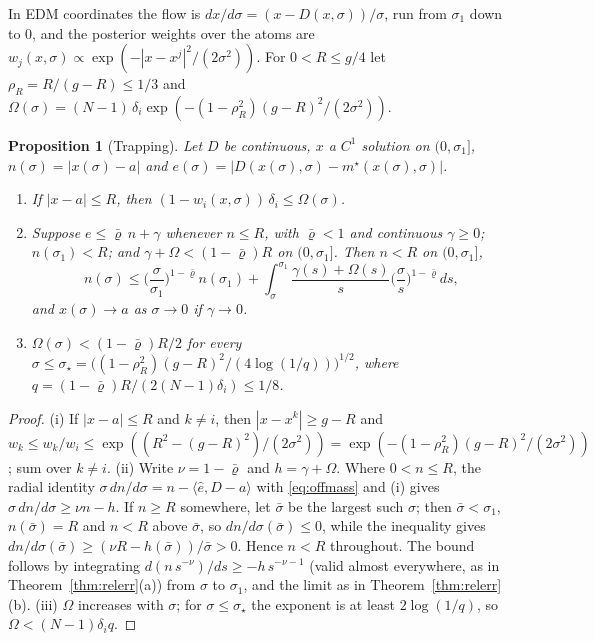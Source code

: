\documentclass{article} %
\theoremstyle{plain}
\newtheorem{proposition}[theorem]{Proposition}
\theoremstyle{definition}
\theoremstyle{remark}
\begin{document}
In EDM coordinates the flow is $dx/d\sigma=(x-D(x,\sigma))/\sigma$, run from $\sigma_1$ down to $0$, and
the posterior weights over the atoms are
$w_j(x,\sigma)\propto\exp(-|x-x^j|^2/(2\sigma^2))$. For $0<R\le g/4$ let $\rho_R=R/(g-R)\le1/3$ and
$\Omega(\sigma)=(N-1)\,\delta_i\exp(-(1-\rho_R^2)(g-R)^2/(2\sigma^2))$.

\begin{proposition}[Trapping]
\label{prop:trap}
Let $D$ be continuous, $x$ a $C^1$ solution on $(0,\sigma_1]$, $n(\sigma)=|x(\sigma)-a|$ and
$e(\sigma)=|D(x(\sigma),\sigma)-m^\star(x(\sigma),\sigma)|$.
\begin{enumerate}[label=(\roman*),leftmargin=2em]
\item If $|x-a|\le R$, then $(1-w_i(x,\sigma))\,\delta_i\le\Omega(\sigma)$.
\item Suppose $e\le\bar\varrho\,n+\gamma$ whenever $n\le R$, with $\bar\varrho<1$ and continuous
  $\gamma\ge0$; $n(\sigma_1)<R$; and $\gamma+\Omega<(1-\bar\varrho)R$ on $(0,\sigma_1]$. Then
  $n<R$ on $(0,\sigma_1]$,
  \[
  n(\sigma)\le\Big(\frac{\sigma}{\sigma_1}\Big)^{1-\bar\varrho}n(\sigma_1)
  +\int_\sigma^{\sigma_1}\frac{\gamma(s)+\Omega(s)}{s}\Big(\frac{\sigma}{s}\Big)^{1-\bar\varrho}ds,
  \]
  and $x(\sigma)\to a$ as $\sigma\to0$ if $\gamma\to0$.
\item $\Omega(\sigma)<(1-\bar\varrho)R/2$ for every
  $\sigma\le\sigma_\star=\big((1-\rho_R^2)(g-R)^2/(4\log(1/q))\big)^{1/2}$, where
  $q=(1-\bar\varrho)R/(2(N-1)\delta_i)\le1/8$.
\end{enumerate}
\end{proposition}

\begin{proof}
(i) If $|x-a|\le R$ and $k\ne i$, then $|x-x^k|\ge g-R$ and
$w_k\le w_k/w_i\le\exp((R^2-(g-R)^2)/(2\sigma^2))=\exp(-(1-\rho_R^2)(g-R)^2/(2\sigma^2))$; sum over
$k\ne i$. (ii) Write $\nu=1-\bar\varrho$ and $h=\gamma+\Omega$. Where $0<n\le R$, the radial identity
$\sigma\,dn/d\sigma=n-\langle\hat e,D-a\rangle$ with \eqref{eq:offmass} and (i) gives
$\sigma\,dn/d\sigma\ge\nu n-h$. If $n\ge R$ somewhere, let $\bar\sigma$ be the largest such
$\sigma$; then $\bar\sigma<\sigma_1$, $n(\bar\sigma)=R$ and $n<R$ above $\bar\sigma$, so
$dn/d\sigma(\bar\sigma)\le0$, while the inequality gives
$dn/d\sigma(\bar\sigma)\ge(\nu R-h(\bar\sigma))/\bar\sigma>0$. Hence $n<R$ throughout. The bound
follows by integrating $d(n\,s^{-\nu})/ds\ge-h\,s^{-\nu-1}$ (valid almost everywhere, as in
Theorem~\ref{thm:relerr}(a)) from $\sigma$ to $\sigma_1$, and the limit as in
Theorem~\ref{thm:relerr}(b). (iii) $\Omega$ increases with $\sigma$; for $\sigma\le\sigma_\star$ the
exponent is at least $2\log(1/q)$, so $\Omega<(N-1)\delta_iq$.
\end{proof}
\end{document}
